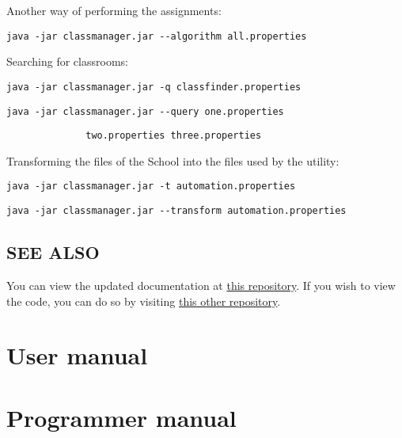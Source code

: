 Another way of performing the assignments:

\verb|java -jar classmanager.jar --algorithm all.properties|

Searching for classrooms:

\verb|java -jar classmanager.jar -q classfinder.properties|

\verb|java -jar classmanager.jar --query one.properties|

\verb|              two.properties three.properties|

Transforming the files of the School into the files used by the utility:

\verb|java -jar classmanager.jar -t automation.properties|

\verb|java -jar classmanager.jar --transform automation.properties|



\subsection*{SEE ALSO}

You can view the updated documentation at \href{https://github.com/fonsecadh/classroom-manager-doc}{this repository}. If you wish to view the code, you can do so by visiting \href{https://github.com/fonsecadh/classroom-manager-code}{this other repository}.



\section{User manual}



\section{Programmer manual}

